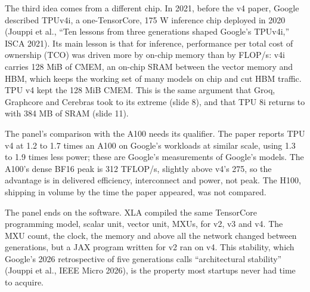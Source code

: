 \documentclass[11pt,letterpaper]{article}
\begin{document}
The third idea comes from a different chip. In 2021, before the v4 paper, Google described TPUv4i, a one-TensorCore, 175 W inference chip deployed in 2020 (Jouppi et al., ``Ten lessons from three generations shaped Google's TPUv4i,'' ISCA 2021). Its main lesson is that for inference, performance per total cost of ownership (TCO) was driven more by on-chip memory than by FLOP/s: v4i carries 128 MiB of CMEM, an on-chip SRAM between the vector memory and HBM, which keeps the working set of many models on chip and cut HBM traffic. TPU v4 kept the 128 MiB CMEM. This is the same argument that Groq, Graphcore and Cerebras took to its extreme (slide 8), and that TPU 8i returns to with 384 MB of SRAM (slide 11).

The panel's comparison with the A100 needs its qualifier. The paper reports TPU v4 at 1.2 to 1.7 times an A100 on Google's workloads at similar scale, using 1.3 to 1.9 times less power; these are Google's measurements of Google's models. The A100's dense BF16 peak is 312 TFLOP/s, slightly above v4's 275, so the advantage is in delivered efficiency, interconnect and power, not peak. The H100, shipping in volume by the time the paper appeared, was not compared.

The panel ends on the software. XLA compiled the same TensorCore programming model, scalar unit, vector unit, MXUs, for v2, v3 and v4. The MXU count, the clock, the memory and above all the network changed between generations, but a JAX program written for v2 ran on v4. This stability, which Google's 2026 retrospective of five generations calls ``architectural stability'' (Jouppi et al., IEEE Micro 2026), is the property most startups never had time to acquire.
\end{document}

